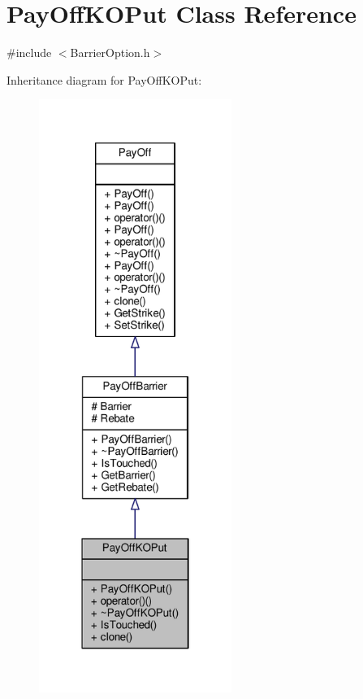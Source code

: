 \hypertarget{classPayOffKOPut}{}\section{Pay\+Off\+K\+O\+Put Class Reference}
\label{classPayOffKOPut}


{\ttfamily \#include $<$Barrier\+Option.\+h$>$}



Inheritance diagram for Pay\+Off\+K\+O\+Put\+:
\nopagebreak
\begin{figure}[H]
\begin{center}
\leavevmode
\includegraphics[width=178pt]{classPayOffKOPut__inherit__graph}
\end{center}
\end{figure}


